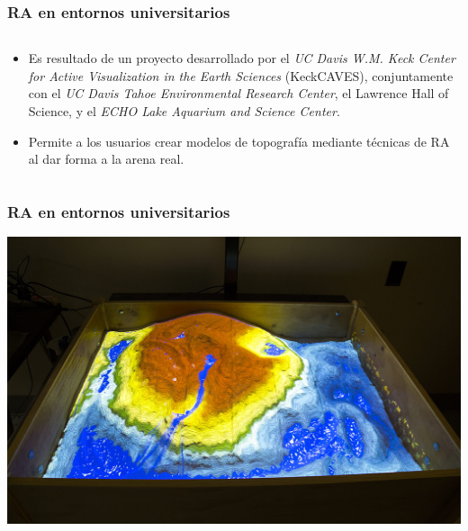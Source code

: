 \begin{frame}
	\frametitle{RA en entornos universitarios}
	\begin{columns}
		\begin{column}{0.9\textwidth}
			\begin{itemize}
				\item Es resultado de un proyecto desarrollado por 
				el \textit{UC Davis W.M. Keck Center for Active Visualization in the Earth Sciences} (KeckCAVES), 
				conjuntamente con el \textit{UC Davis Tahoe Environmental Research Center}, el Lawrence Hall of Science, y el \textit{ECHO Lake Aquarium and Science Center}.
				\item Permite a los usuarios crear modelos de topografía mediante técnicas de RA al dar forma a la arena real. 
					\end{itemize}
				\endblock{}
			\end{column}
		\end{columns}
		\endblock{}
\end{frame}	

\begin{frame}
	\frametitle{RA en entornos universitarios}
	\vfill 
	\begin{center}
		\includegraphics[width=0.8\linewidth]{Images/sandAR}
	\end{center}
\end{frame}


